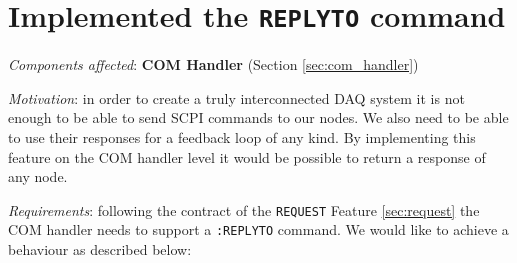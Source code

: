 \section{Implemented the \texttt{REPLYTO} command}
\label{sec:replyto}

\textit{Components affected}: \textbf{COM Handler} (Section \ref{sec:com_handler})

\textit{Motivation}: in order to create a truly interconnected DAQ system it is not enough to be able to send SCPI commands to our nodes. We also need to be able to use their responses for a feedback loop of any kind. By implementing this feature on the COM handler level it  would be possible to return a response of any node.

\textit{Requirements}: following the contract of the \texttt{REQUEST} Feature \ref{sec:request} the COM handler needs to support a \texttt{:REPLYTO} command. We would like to achieve a behaviour as described below:

